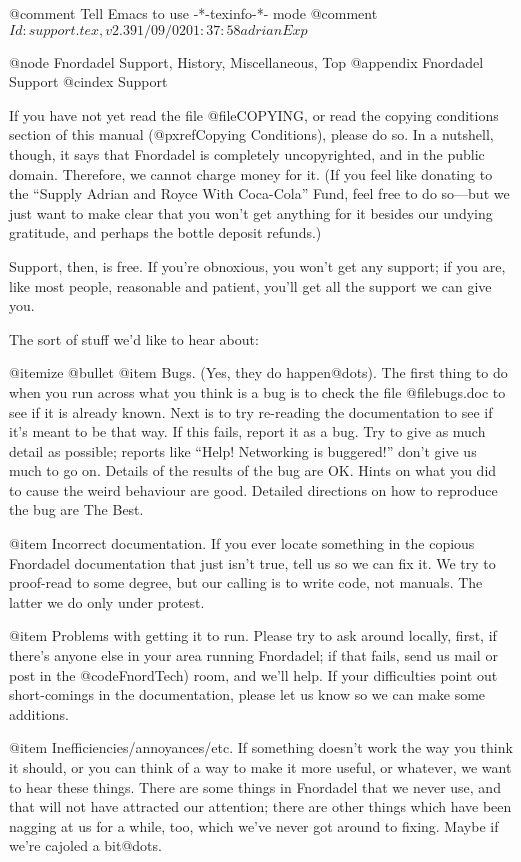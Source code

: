 @comment Tell Emacs to use -*-texinfo-*- mode
@comment $Id: support.tex,v 2.3 91/09/02 01:37:58 adrian Exp $

@node Fnordadel Support, History, Miscellaneous, Top
@appendix Fnordadel Support
@cindex Support

If you have not yet read the file @file{COPYING}, or read the copying
conditions section of this manual (@pxref{Copying Conditions}), please do
so.  In a nutshell, though, it says that Fnordadel is completely
uncopyrighted, and in the public domain.
Therefore, we cannot charge money for it.  (If you feel like donating
to the ``Supply Adrian and Royce With Coca-Cola'' Fund, feel free to do
so---but we just want to make clear that you won't get anything for it besides
our undying gratitude, and perhaps the bottle deposit refunds.)

Support, then, is free.  If you're obnoxious, you won't get any
support; if you are, like most people, reasonable and patient, you'll get
all the support we can give you.

The sort of stuff we'd like to hear about:

@itemize @bullet
@item
Bugs.  (Yes, they do happen@dots{}).  The first thing to do when you run
across what you think is a bug is to check the file @file{bugs.doc} to see if
it is already known.  Next is to try re-reading the documentation to see if
it's meant to be that way.  If this fails, report it as a bug.  Try to give
as much detail as possible; reports like ``Help! Networking is buggered!''
don't give us much to go on.  Details of the results of the bug are OK.  Hints
on what you did to cause the weird behaviour are good.  Detailed directions
on how to reproduce the bug are The Best.

@item
Incorrect documentation.  If you ever locate something in the
copious Fnordadel documentation that just isn't true, tell
us so we can fix it.  We try to proof-read to some degree, but
our calling is to write code, not manuals.  The latter we do
only under protest.

@item
Problems with getting it to run.  Please try to ask around
locally, first, if there's anyone else in your area running
Fnordadel; if that fails, send us mail or post in the
@code{FnordTech)} room, and we'll help.  If
your difficulties point out short-comings in the documentation,
please let us know so we can make some additions.

@item
Inefficiencies/annoyances/etc.  If something doesn't work the
way you think it should, or you can think of a way to make it
more useful, or whatever, we want to hear these things.  There
are some things in Fnordadel that we never use, and that
will not have attracted our attention; there are other things
which have been nagging at us for a while, too, which we've
never got around to fixing.  Maybe if we're cajoled a bit@dots{}.

